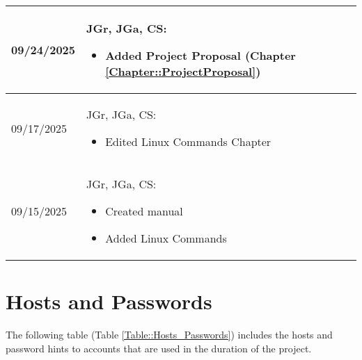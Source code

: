 \begin{longtable}{|l||p{12.5cm}|}
09/24/2025 & JGr, JGa, CS:
\begin{itemize}[topsep=0pt,itemsep=0pt,parsep=0pt,partopsep=0pt,leftmargin=12pt]
\item Added Project Proposal (Chapter \ref{Chapter::ProjectProposal})
\end{itemize} 
\\ \hline

09/17/2025 & JGr, JGa, CS:
\begin{itemize}[topsep=0pt,itemsep=0pt,parsep=0pt,partopsep=0pt,leftmargin=12pt]
\item Edited Linux Commands Chapter
\end{itemize} 
\\ \hline

09/15/2025 & JGr, JGa, CS:
\begin{itemize}[topsep=0pt,itemsep=0pt,parsep=0pt,partopsep=0pt,leftmargin=12pt]
\item Created manual
\item Added Linux Commands
\end{itemize} 
\\ \hline

\end{longtable}

\section{Hosts and Passwords}

The following table (Table \ref{Table::Hosts_Passwords}) includes the hosts and password hints to accounts that are used in the duration of the project.

